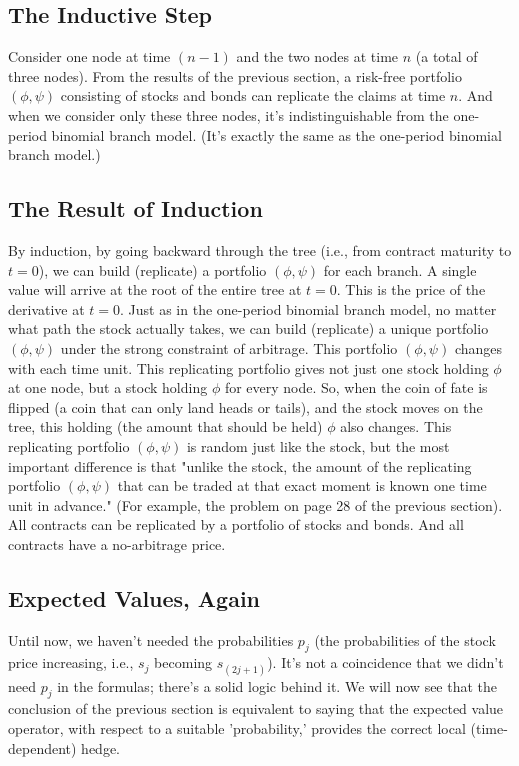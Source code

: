 \documentclass[uplatex,a4j,12pt,dvipdfmx]{jsarticle}
\begin{document}
\subsection{The Inductive Step}
Consider one node at time $(n-1)$ and the two nodes at time $n$ (a total of three nodes). From the results of the previous section, a risk-free portfolio $(\phi, \psi)$ consisting of stocks and bonds can replicate the claims at time $n$. And when we consider only these three nodes, it's indistinguishable from the one-period binomial branch model. (It's exactly the same as the one-period binomial branch model.)

\subsection{The Result of Induction}
By induction, by going backward through the tree (i.e., from contract maturity to $t=0$), we can build (replicate) a portfolio $(\phi, \psi)$ for each branch. A single value will arrive at the root of the entire tree at $t=0$. This is the price of the derivative at $t=0$. Just as in the one-period binomial branch model, no matter what path the stock actually takes, we can build (replicate) a unique portfolio $(\phi, \psi)$ under the strong constraint of arbitrage. This portfolio $(\phi, \psi)$ changes with each time unit. This replicating portfolio gives not just one stock holding $\phi$ at one node, but a stock holding $\phi$ for every node. So, when the coin of fate is flipped (a coin that can only land heads or tails), and the stock moves on the tree, this holding (the amount that should be held) $\phi$ also changes. This replicating portfolio $(\phi,\psi)$ is random just like the stock, but the most important difference is that "unlike the stock, the amount of the replicating portfolio $(\phi,\psi)$ that can be traded at that exact moment is known one time unit in advance." (For example, the problem on page 28 of the previous section). All contracts can be replicated by a portfolio of stocks and bonds. And all contracts have a no-arbitrage price.

\subsection{Expected Values, Again}
Until now, we haven't needed the probabilities $p_j$ (the probabilities of the stock price increasing, i.e., $s_j$ becoming $s_{(2j+1)}$). It's not a coincidence that we didn't need $p_j$ in the formulas; there's a solid logic behind it. We will now see that the conclusion of the previous section is equivalent to saying that the expected value operator, with respect to a suitable 'probability,' provides the correct local (time-dependent) hedge.
\end{document}
